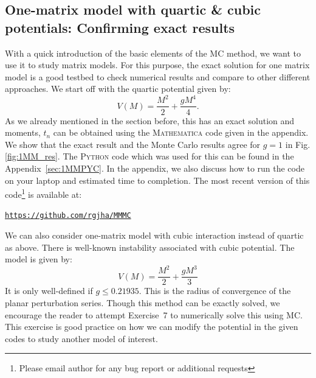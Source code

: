 \documentclass[11pt]{article}
\newcommand{\MA}{\textsc{Mathematica }}
\newcommand{\PY}{\textsc{Python }}
\begin{document}
\subsection{One-matrix model with quartic \& cubic potentials: Confirming exact results} 
With a quick introduction of the basic elements of the MC method, we want to use it to study matrix models. For this purpose, 
the exact solution for one matrix model is a good testbed to check numerical results and compare to other different approaches. 
We start off with the quartic potential given by:
\begin{equation}
	V(M) = \frac{M^2}{2} + \frac{gM^4}{4}.  
\end{equation}
As we already mentioned in the section before, this has an exact solution and moments, $t_{n}$ 
can be obtained using the \MA code given in the appendix. We show that the exact result and the 
Monte Carlo results agree for $g=1$ in Fig. \ref{fig:1MM_res}. The \PY code which was used for this 
can be found in the Appendix~\ref{sec:1MMPYC}. In the appendix, we also 
discuss how to run the code on your laptop and estimated time to completion. The most recent version of this 
code\footnote{Please email author for any bug report or additional requests} is available at:
\begin{center} \texttt{\href{https://github.com/rgjha/MMMC}{https://github.com/rgjha/MMMC}} \end{center}
We can also consider one-matrix model with cubic interaction instead of quartic as above. There is well-known instability associated with cubic potential. The model is given by:
\begin{equation}
	V(M) = \frac{M^2}{2} + \frac{gM^3}{3}  
\end{equation}
It is only well-defined if $g \le 0.21935$. This is the radius of convergence of the planar perturbation series. 
Though this method can be exactly solved, we encourage the reader to attempt Exercise~7 to numerically solve this using MC. This exercise is good practice on how we can modify the potential in the given codes to study another model of interest.
\end{document}
